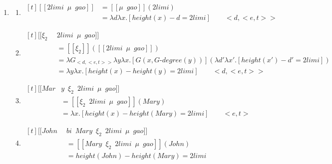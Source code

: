 \documentclass{ctexart}
\begin{document}
\begin{enumerate}
    \item \label{maomao18}
    \begin{enumerate}
        \item \label{maomao18_b}
        $\begin{aligned}[t]
            [\![2limi \enspace \mu \enspace gao]\!] &= [\![\mu \enspace gao]\!](2limi) \\
            &= \lambda d \lambda x. [height(x) - d = 2 limi] \qquad <d,<e,t>>
        \end{aligned}$

        \item \label{maomao18_c}
        $\begin{aligned}[t]
            [\![\xi_2 \enspace & 2limi \enspace \mu \enspace gao]\!] \\
            &= [\![\xi_2]\!]([\![2limi \enspace \mu \enspace gao]\!]) \\
            &= \lambda G_{<d,<e,t>>} \lambda y \lambda x. [G(x,G \mbox{-} degree(y))](\lambda d' \lambda x'. [height(x') - d' = 2 limi])\\
            &= \lambda y \lambda x. [height(x) - height(y) = 2 limi] \qquad <d,<e,t>>
        \end{aligned}$

        \item \label{maomao18_d}
        $\begin{aligned}[t]
            [\![Mar&y \enspace \xi_2 \enspace 2limi \enspace \mu \enspace gao]\!] \\
            &= [\![\xi_2 \enspace 2limi \enspace \mu \enspace gao]\!](Mary) \\
            &=\lambda x.[height(x) - height(Mary)=2limi] \qquad <e,t>
        \end{aligned}$

        \item \label{maomao18_e}
        $\begin{aligned}[t]
            [\![John \enspace &bi \enspace Mary \enspace \xi_2 \enspace 2limi \enspace \mu \enspace gao]\!] \\
            &= [\![Mary \enspace \xi_2 \enspace 2limi \enspace \mu \enspace gao]\!](John) \\
            &=height(John) - height(Mary) = 2limi
        \end{aligned}$

    \end{enumerate}
\end{enumerate}
\end{document}
